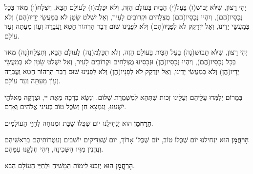 \begin{framed}

\begin{minipage}[t]{0.47\linewidth}

יְהִי רָצוֹן, שֶׁלֹּא יֵבוֹשׁ(וּ) בַּעַל(י) הַבַּיִת בָּעוֹלָם הַזֶּה, וְלֹא יִכָּלֵמ(וּ) לָעוֹלָם הַבָּא, וְיִצְלַח(וּ) מְאֹד בְּכָל נְכָסָיו(הֶם), וְיִהְיוּ נְכָסָיו(הֶם) מֻצְלָחִים וּקְרוֹבִים לָעִיר, וְאַל יִשְׁלֹט שָׂטָן לֹא בְּמַעֲשֵׂי יָדָיו(הֶם) וְלֹא בְּמַעֲשֵׂי יָדֵינוּ, וְאַל יִזְדַקֵק לֹא לְפָנָיו(הֶם) וְלֹא לְפָנֵינוּ שׁוּם דְבַר הַרְהוֹר חֵטְא וַעֲבֵרָה וְעָוֹן מֵעַתָּה וְעַד עוֹלָם.
\end{minipage}\hspace{0.01\linewidth}\vrule{}\hspace{0.01\linewidth}
\begin{minipage}[t]{0.47\linewidth}

יְהִי רָצוֹן, שֶׁלֹּא תֵבוֹשׁ(נָה) בַּעַל הַבַּיִת בָּעוֹלָם הַזֶּה, וְלֹא תִכָּלֵמ(נָה) לָעוֹלָם הַבָּא, וְתִצְלַח(נָה) מְאֹד בְּכָל נְכָסָיו(הֶם), וְיִהְיוּ נְכָסָיו(הֶן) וּנְכָסֵינוּ מֻצְלָחִים וּקְרוֹבִים לָעִיר, וְאַל יִשְׁלֹט שָׂטָן לֹא בְּמַעֲשֵׂי יָדָיו(הֶן) וְלֹא בְּמַעֲשֵׂי יָדֵינוּ, וְאַל יִזְדַקֵק לֹא לְפָנָיו(הֶן) וְלֹא לְפָנֵינוּ שׁוּם דְבַר הַרְהוֹר חֵטְא וַעֲבֵרָה וְעָוֹן מֵעַתָּה וְעַד עוֹלָם.
\end{minipage}
\end{framed}

בַּמָרוֹם יְלַמְּדוּ עֲלֵיהֶם וְעָלֵינוּ זְכוּת שֶׁתְּהֵא לְמִשְׁמֶרֶת שָׁלוֹם. וְנִשָׂא בְרָכָה מֵאֵת יי, וּצְדָקָה מֵאלֹהֵי יִשְׁעֵנוּ, וְנִמְצָא חֵן וְשֵׂכֶל טוֹב בְּעֵינֵי אֱלֹהִים וְאָדָם.


\begin{center}

\begin{framed}

{\bf הָרַחֲמָן}
הוּא יַנְחִילֵנוּ יוֹם שֶׁכֻּלוֹ שַׁבָּת וּמְנוּחָה לְחַיֵּי הָעוֹלָמִים.
\end{framed}

{\bf הָרַחֲמָן}
הוּא יַנְחִילֵנוּ יוֹם שֶׁכֻּלוֹ טוֹב, יוֹם שֶׁכֻּלּוֹ אָרוֹךְ, יוֹם שֶׁצַּדִּיקִים יוֹשְׁבִים וְעַטְרוֹתֵיהֶם בְּרָאשֵׁיהֶם וְנֶהֱנִין מִזִּיו הַשְּׁכִינָה, וִיהִי חֶלְקֵנוּ עִמָּהֶם.

{\bf הָרַחֲמָן}
הוּא יְזַכֵּנוּ לִימוֹת הַמָּשִׁיחַ וּלְחַיֵּי הָעוֹלָם הַבָּא.
\end{center}

